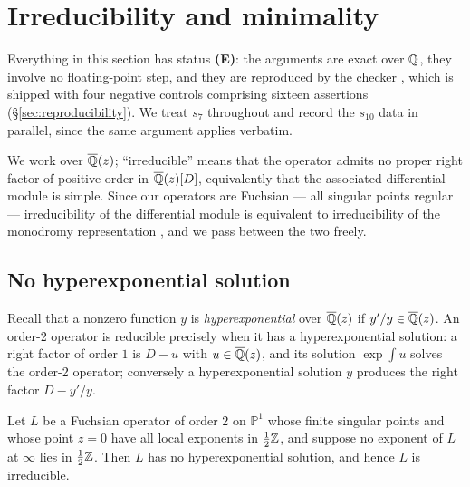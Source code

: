 \section{Irreducibility and minimality}\label{sec:irreducibility}

Everything in this section has status \textbf{(E)}: the arguments are exact
over $\mathbb{Q}$, they involve no floating-point step, and they are reproduced by the
checker , which is shipped with
four negative controls comprising sixteen assertions
(\S\ref{sec:reproducibility}). We treat $s_7$ throughout and record the
$s_{10}$ data in parallel, since the same argument applies verbatim.

We work over $\overline{\mathbb{Q}}(z)$; ``irreducible'' means that the operator
admits no proper right factor of positive order in $\overline{\mathbb{Q}}(z)[D]$,
equivalently that the associated differential module is simple. Since our
operators are Fuchsian --- all singular points regular --- irreducibility of
the differential module is equivalent to irreducibility of the monodromy
representation \cite[Ch.~5--6]{vanderPutSinger2003}, and we pass between the
two freely.

\subsection{No hyperexponential solution}

Recall that a nonzero function $y$ is \emph{hyperexponential} over
$\overline{\mathbb{Q}}(z)$ if $y'/y \in \overline{\mathbb{Q}}(z)$. An order-2 operator is
reducible precisely when it has a hyperexponential solution: a right factor of
order $1$ is $D - u$ with $u \in \overline{\mathbb{Q}}(z)$, and its solution
$\exp\int u$ solves the order-2 operator; conversely a hyperexponential
solution $y$ produces the right factor $D - y'/y$.

\begin{lemma}\label{lem:denominator}
Let $L$ be a Fuchsian operator of order $2$ on $\mathbb{P}^1$ whose finite
singular points and whose point $z=0$ have all local exponents in
$\tfrac12\mathbb{Z}$, and suppose no exponent of $L$ at $\infty$ lies in $\tfrac12\mathbb{Z}$.
Then $L$ has no hyperexponential solution, and hence $L$ is irreducible.
\end{lemma}


